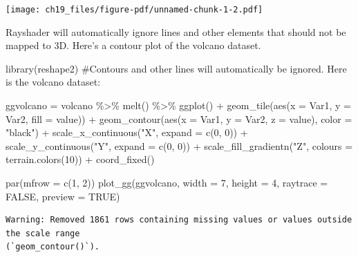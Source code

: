 \documentclass[
  letterpaper,
]{scrbook}
\newenvironment{Shaded}{\begin{snugshade}}{\end{snugshade}}
\newcommand{\AttributeTok}[1]{\textcolor[rgb]{0.40,0.45,0.13}{#1}}
\newcommand{\CommentTok}[1]{\textcolor[rgb]{0.37,0.37,0.37}{#1}}
\newcommand{\ConstantTok}[1]{\textcolor[rgb]{0.56,0.35,0.01}{#1}}
\newcommand{\DecValTok}[1]{\textcolor[rgb]{0.68,0.00,0.00}{#1}}
\newcommand{\FunctionTok}[1]{\textcolor[rgb]{0.28,0.35,0.67}{#1}}
\newcommand{\NormalTok}[1]{\textcolor[rgb]{0.00,0.23,0.31}{#1}}
\newcommand{\OtherTok}[1]{\textcolor[rgb]{0.00,0.23,0.31}{#1}}
\newcommand{\SpecialCharTok}[1]{\textcolor[rgb]{0.37,0.37,0.37}{#1}}
\newcommand{\StringTok}[1]{\textcolor[rgb]{0.13,0.47,0.30}{#1}}
\begin{document}
\texttt{[image: ch19\_files/figure-pdf/unnamed-chunk-1-2.pdf]}

Rayshader will automatically ignore lines and other elements that should
not be mapped to 3D. Here's a contour plot of the volcano dataset.

\begin{Shaded}
\begin{Highlighting}[]
\FunctionTok{library}\NormalTok{(reshape2)}
\CommentTok{\#Contours and other lines will automatically be ignored. Here is the volcano dataset:}

\NormalTok{ggvolcano }\OtherTok{=}\NormalTok{ volcano }\SpecialCharTok{\%\textgreater{}\%} 
  \FunctionTok{melt}\NormalTok{() }\SpecialCharTok{\%\textgreater{}\%}
  \FunctionTok{ggplot}\NormalTok{() }\SpecialCharTok{+}
  \FunctionTok{geom\_tile}\NormalTok{(}\FunctionTok{aes}\NormalTok{(}\AttributeTok{x =}\NormalTok{ Var1, }\AttributeTok{y =}\NormalTok{ Var2, }\AttributeTok{fill =}\NormalTok{ value)) }\SpecialCharTok{+}
  \FunctionTok{geom\_contour}\NormalTok{(}\FunctionTok{aes}\NormalTok{(}\AttributeTok{x =}\NormalTok{ Var1, }\AttributeTok{y =}\NormalTok{ Var2, }\AttributeTok{z =}\NormalTok{ value), }\AttributeTok{color =} \StringTok{"black"}\NormalTok{) }\SpecialCharTok{+}
  \FunctionTok{scale\_x\_continuous}\NormalTok{(}\StringTok{"X"}\NormalTok{, }\AttributeTok{expand =} \FunctionTok{c}\NormalTok{(}\DecValTok{0}\NormalTok{, }\DecValTok{0}\NormalTok{)) }\SpecialCharTok{+}
  \FunctionTok{scale\_y\_continuous}\NormalTok{(}\StringTok{"Y"}\NormalTok{, }\AttributeTok{expand =} \FunctionTok{c}\NormalTok{(}\DecValTok{0}\NormalTok{, }\DecValTok{0}\NormalTok{)) }\SpecialCharTok{+}
  \FunctionTok{scale\_fill\_gradientn}\NormalTok{(}\StringTok{"Z"}\NormalTok{, }\AttributeTok{colours =} \FunctionTok{terrain.colors}\NormalTok{(}\DecValTok{10}\NormalTok{)) }\SpecialCharTok{+}
  \FunctionTok{coord\_fixed}\NormalTok{()}

\FunctionTok{par}\NormalTok{(}\AttributeTok{mfrow =} \FunctionTok{c}\NormalTok{(}\DecValTok{1}\NormalTok{, }\DecValTok{2}\NormalTok{))}
\FunctionTok{plot\_gg}\NormalTok{(ggvolcano, }\AttributeTok{width =} \DecValTok{7}\NormalTok{, }\AttributeTok{height =} \DecValTok{4}\NormalTok{, }\AttributeTok{raytrace =} \ConstantTok{FALSE}\NormalTok{, }\AttributeTok{preview =} \ConstantTok{TRUE}\NormalTok{)}
\end{Highlighting}
\end{Shaded}

\begin{verbatim}
Warning: Removed 1861 rows containing missing values or values outside the scale range
(`geom_contour()`).
\end{verbatim}
\end{document}
